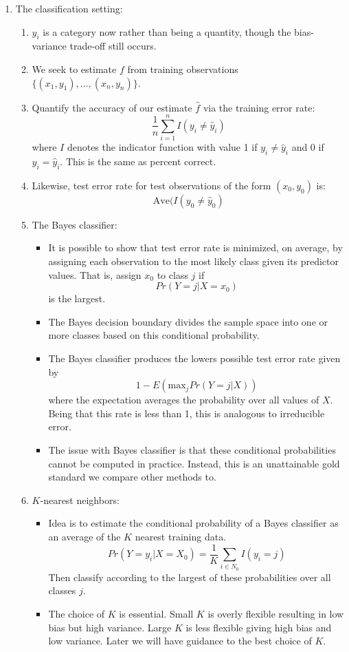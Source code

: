 \documentclass{article}
\begin{document}
\begin{enumerate}
\item The classification setting:
\begin{enumerate}
\item $y_i$ is a category now rather than being a quantity, though the bias-variance trade-off still occurs.
\item We seek to estimate $f$ from training observations $\{(x_1, y_1), \dots, (x_n, y_n) \}$.
\item Quantify the accuracy of our estimate $\hat{f}$ via the training error rate:
\[
\frac{1}{n} \sum_{i=1}^n I(y_i \neq \hat{y}_i)
\]
where $I$ denotes the indicator function with value 1 if $y_i \neq \hat{y}_i$ and 0 if $y_i = \hat{y}_i$. This is the same as percent correct.
\item Likewise, test error rate for test observations of the form $(x_0, y_0)$ is:
\[
\text{Ave}(I(y_0 \neq \hat{y}_0)
\]
\item The Bayes classifier:
\begin{itemize}
\item It is possible to show that test error rate is minimized, on average, by assigning each observation to the most likely class given its predictor values. That is, assign $x_0$ to class $j$ if
\[
Pr(Y=j | X=x_0)
\]
is the largest.
\item The Bayes decision boundary divides the sample space into one or more classes based on this conditional probability.
\item The Bayes classifier produces the lowers possible test error rate given by 
\[
1-E(\text{max}_j Pr(Y=j | X))
\]
where the expectation averages the probability over all values of $X$. Being that this rate is less than 1, this is analogous to irreducible error.
\item The issue with Bayes classifier is that these conditional probabilities cannot be computed in practice. Instead, this is an unattainable gold standard we compare other methods to.
\end{itemize}

\item $K$-nearest neighbors:
\begin{itemize}
\item Idea is to estimate the conditional probability of a Bayes classifier as an average of the $K$ nearest training data. 
\[
Pr(Y=y_i | X=X_0) = \frac{1}{K} \sum_{i \in N_0} I(y_i=j)
\]
Then classify according to the largest of these probabilities over all classes $j$.
\item The choice of $K$ is essential. Small $K$ is overly flexible resulting in low bias but high variance. Large $K$ is less flexible giving high bias and low variance. Later we will have guidance to the best choice of $K$.
\end{itemize}
\end{enumerate}
\end{enumerate}
\end{document}
